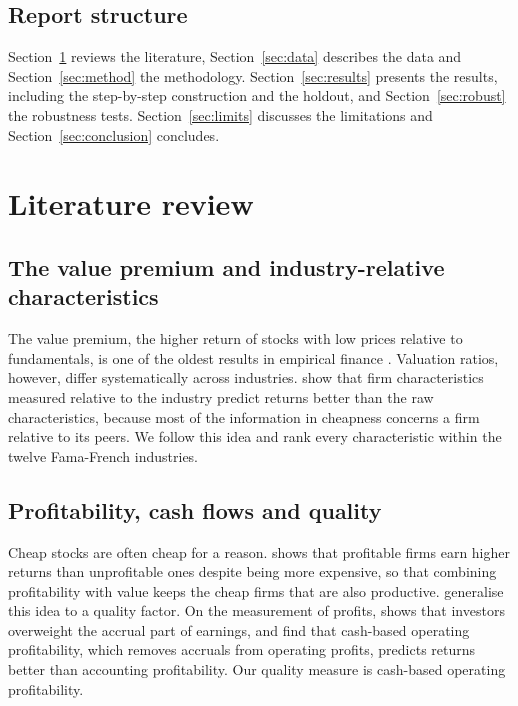 \documentclass[12pt,a4paper]{article}
\begin{document}
\subsection{Report structure}

Section~\ref{sec:lit} reviews the literature, Section~\ref{sec:data} describes the data and
Section~\ref{sec:method} the methodology. Section~\ref{sec:results} presents the results, including
the step-by-step construction and the holdout, and Section~\ref{sec:robust} the robustness tests.
Section~\ref{sec:limits} discusses the limitations and Section~\ref{sec:conclusion} concludes.

\section{Literature review}\label{sec:lit}

\subsection{The value premium and industry-relative characteristics}

The value premium, the higher return of stocks with low prices relative to fundamentals, is one of
the oldest results in empirical finance \citep{FamaFrench1992,LakonishokShleiferVishny1994}.
Valuation ratios, however, differ systematically across industries. \citet{AsnessPorterStevens2000}
show that firm characteristics measured relative to the industry predict returns better than the raw
characteristics, because most of the information in cheapness concerns a firm relative to its
peers. We follow this idea and rank every characteristic within the twelve Fama-French industries.

\subsection{Profitability, cash flows and quality}

Cheap stocks are often cheap for a reason. \citet{NovyMarx2013} shows that profitable firms earn
higher returns than unprofitable ones despite being more expensive, so that combining profitability
with value keeps the cheap firms that are also productive. \citet{AsnessFrazziniPedersen2019}
generalise this idea to a quality factor. On the measurement of profits, \citet{Sloan1996} shows
that investors overweight the accrual part of earnings, and
\citet{BallGerakosLinnainmaaNikolaev2016} find that cash-based operating profitability, which removes
accruals from operating profits, predicts returns better than accounting profitability. Our quality
measure is cash-based operating profitability.
\end{document}
